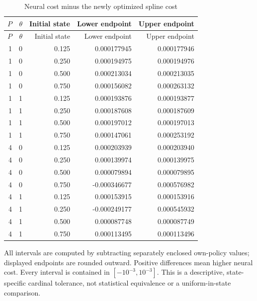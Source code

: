 \documentclass[ecta,nameyear,draft]{econsocart}
\theoremstyle{definition}
\theoremstyle{remark}
\begin{document}
\begin{longtable}{rrrrr}
\caption{Neural cost minus the newly optimized spline cost}\label{tab:r41difference}\\\toprule
$P$ & $\theta$ & Initial state & Lower endpoint & Upper endpoint\\\midrule\endfirsthead
\toprule $P$ & $\theta$ & Initial state & Lower endpoint & Upper endpoint\\\midrule\endhead
1 & 0 & 0.125 & 0.000177945 & 0.000177946\\
1 & 0 & 0.250 & 0.000194975 & 0.000194976\\
1 & 0 & 0.500 & 0.000213034 & 0.000213035\\
1 & 0 & 0.750 & 0.000156082 & 0.000263132\\
1 & 1 & 0.125 & 0.000193876 & 0.000193877\\
1 & 1 & 0.250 & 0.000187608 & 0.000187609\\
1 & 1 & 0.500 & 0.000197012 & 0.000197013\\
1 & 1 & 0.750 & 0.000147061 & 0.000253192\\
4 & 0 & 0.125 & 0.000203939 & 0.000203940\\
4 & 0 & 0.250 & 0.000139974 & 0.000139975\\
4 & 0 & 0.500 & 0.000079894 & 0.000079895\\
4 & 0 & 0.750 & -0.000346677 & 0.000576982\\
4 & 1 & 0.125 & 0.000153915 & 0.000153916\\
4 & 1 & 0.250 & -0.000249177 & 0.000545932\\
4 & 1 & 0.500 & 0.000087748 & 0.000087749\\
4 & 1 & 0.750 & 0.000113495 & 0.000113496\\
\bottomrule\end{longtable}
All intervals are computed by subtracting separately enclosed own-policy values; displayed endpoints are rounded outward. Positive differences mean higher neural cost. Every interval is contained in $[-10^{-3},10^{-3}]$. This is a descriptive, state-specific cardinal tolerance, not statistical equivalence or a uniform-in-state comparison.



\end{document}
